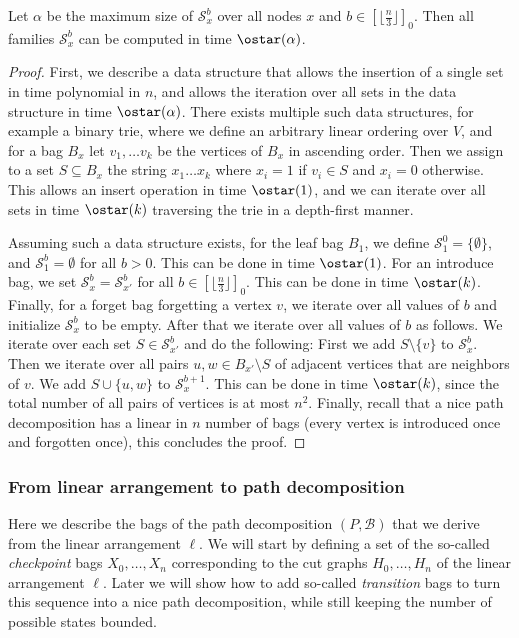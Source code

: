 \documentclass[a4paper,UKenglish,cleveref, autoref, thm-restate]{lipics-v2021}
\begin{document}
\begin{lemma}\label{lem:time-bound-in-states}
    Let $\alpha$ be the maximum size of $\mathcal{S}_x^b$ over all nodes $x$ and $b\in [\lfloor\frac{n}{3}\rfloor]_0$. Then all families $\mathcal{S}_x^b$ can be computed in time $\ostar(\alpha)$.
\end{lemma}

\begin{proof}
    First, we describe a data structure that allows the insertion of a single set in time polynomial in $n$, and allows the iteration over all sets in the data structure in time $\ostar(\alpha)$. There exists multiple such data structures, for example a binary trie, where we define an arbitrary linear ordering over $V$, and for a bag $B_x$ let $v_1,\dots v_k$ be the vertices of $B_x$ in ascending order. 
    Then we assign to a set $S\subseteq B_x$ the string $x_1\dots x_k$ where $x_i = 1$ if $v_i\in S$ and $x_i = 0$ otherwise. This allows an insert operation in time $\ostar(1)$, and we can iterate over all sets in time $\ostar(k)$ traversing the trie in a depth-first manner.

    Assuming such a data structure exists, for the leaf bag $B_1$, we define $\mathcal{S}_1^0 = \{\emptyset\}$, and $\mathcal{S}_1^b = \emptyset$ for all $b>0$. This can be done in time $\ostar(1)$.
    For an introduce bag, we set $\mathcal{S}_x^b = \mathcal{S}_{x'}^b$ for all $b\in [\lfloor\frac{n}{3}\rfloor]_0$. This can be done in time $\ostar(k)$.
    Finally, for a forget bag forgetting a vertex $v$, we iterate over all values of $b$ and initialize $\mathcal{S}_x^b$ to be empty. After that we iterate over all values of $b$ as follows.
    We iterate over each set $S\in \mathcal{S}_{x'}^b$ and do the following:
    First we add $S\setminus \{v\}$ to $\mathcal{S}_x^b$. Then we iterate over all pairs $u,w\in B_{x'}\setminus S$ of adjacent vertices that are neighbors of $v$.
    We add $S\cup\{u,w\}$ to $\mathcal{S}_x^{b+1}$. This can be done in time $\ostar(k)$, since the total number of all pairs of vertices is at most $n^2$.
    Finally, recall that a nice path decomposition has a linear in $n$ number of bags (every vertex is introduced once and forgotten once), this concludes the proof.
\end{proof}

\subsubsection*{From linear arrangement to path decomposition}
Here we describe the bags of the path decomposition $(P, \mathcal{B})$ that we derive from the linear arrangement $\ell$. 
We will start by defining a set of the so-called \emph{checkpoint} bags $X_0, \dots, X_n$ corresponding to the cut graphs $H_0, \dots, H_n$ of the linear arrangement $\ell$.
Later we will show how to add so-called \emph{transition} bags to turn this sequence into a nice path decomposition, while still keeping the number of possible states bounded.
\end{document}
